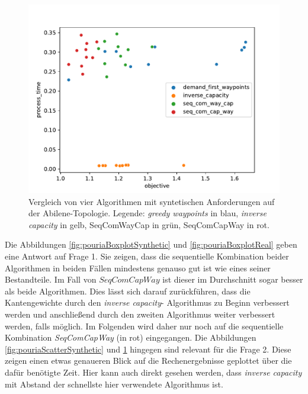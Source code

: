 \documentclass[sigconf, nonacm, review]{acmart}
\begin{document}
\begin{figure}
\centering
\includegraphics[width=\linewidth]{figures/pouria_colored_scatter_plot_results_real_demands.pdf}
\caption{Vergleich von vier Algorithmen mit syntetischen Anforderungen auf der Abilene-Topologie. Legende: \emph{greedy waypoints} in blau, \emph{inverse capacity} in gelb, SeqComWayCap in gr\"un, SeqComCapWay in rot.}
\label{fig:pouriaScatterReal}
\end{figure}
Die Abbildungen \ref{fig:pouriaBoxplotSynthetic} und \ref{fig:pouriaBoxplotReal} geben eine Antwort auf Frage 1.\newline
Sie zeigen, 
dass die sequentielle Kombination beider Algorithmen in beiden F\"allen mindestens genauso gut ist wie eines seiner Bestandteile. 
Im Fall von $SeqComCapWay$ ist dieser im Durchschnitt sogar besser als beide Algorithmen.
Dies l\"asst sich darauf zur\"uckf\"uhren, 
dass die Kantengewichte durch den \emph{inverse capacity}-\newline
Algorithmus zu Beginn verbessert werden 
und anschlie\ss end durch den zweiten Algorithmus weiter verbessert werden, falls m\"oglich.
Im Folgenden wird daher nur noch auf die sequentielle Kombination \emph{SeqComCapWay} (in rot) eingegangen.\newline
Die Abbildungen \ref{fig:pouriaScatterSynthetic} und \ref{fig:pouriaScatterReal} hingegen sind relevant f\"ur die Frage 2. 
Diese zeigen einen etwas genaueren Blick auf die Rechenergebnisse geplottet \"uber die daf\"ur ben\"otigte Zeit.
Hier kann auch direkt gesehen werden, dass \emph{inverse capacity} mit Abstand der schnellste hier verwendete Algorithmus ist.
\end{document}
